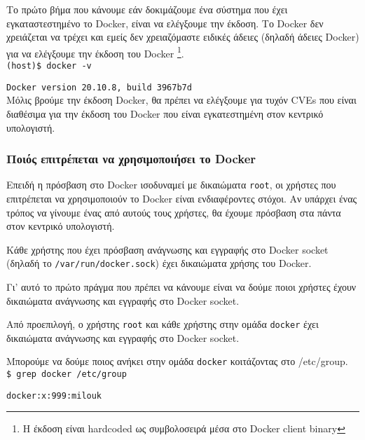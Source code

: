 Το πρώτο βήμα που κάνουμε εάν δοκιμάζουμε ένα σύστημα που έχει εγκαταστεστημένο
το \textlatin{Docker}, είναι να ελέγξουμε την έκδοση. Το \textlatin{Docker} δεν
χρειάζεται να τρέχει και εμείς δεν χρειαζόμαστε ειδικές άδειες (δηλαδή άδειες
\textlatin{Docker}) για να ελέγξουμε την έκδοση του \textlatin{Docker}
\footnote{Η έκδοση είναι \textlatin{hardcoded} ως συμβολοσειρά μέσα στο
\textlatin{Docker client binary}}. \\

\texttt{\textlatin{(host)\$ docker -v}}

\texttt{\textlatin{Docker version 20.10.8, build 3967b7d}} \\

Μόλις βρούμε την έκδοση \textlatin{Docker}, θα πρέπει να ελέγξουμε για τυχόν
\textlatin{CVEs} που είναι διαθέσιμα για την έκδοση του \textlatin{Docker} που
είναι εγκατεστημένη στον κεντρικό υπολογιστή.

\subsubsection{Ποιός επιτρέπεται να χρησιμοποιήσει το \textlatin{Docker}}

Επειδή η πρόσβαση στο \textlatin{Docker} ισοδυναμεί με δικαιώματα
\texttt{\textlatin{root}}, οι χρήστες που επιτρέπεται να χρησιμοποιούν το
\textlatin{Docker} είναι ενδιαφέροντες στόχοι. Αν υπάρχει ένας τρόπος να γίνουμε
ένας από αυτούς τους χρήστες, θα έχουμε πρόσβαση στα πάντα στον κεντρικό
υπολογιστή.

Κάθε χρήστης που έχει πρόσβαση ανάγνωσης και εγγραφής στο
\textlatin{Docker socket} (δηλαδή το \texttt{\textlatin{/var/run/docker.sock}})
έχει δικαιώματα χρήσης του \textlatin{Docker}.

Γι' αυτό το πρώτο πράγμα που πρέπει να κάνουμε είναι να δούμε ποιοι χρήστες
έχουν δικαιώματα ανάγνωσης και εγγραφής στο \textlatin{Docker socket}.

Από προεπιλογή, ο χρήστης \texttt{\textlatin{root}} και κάθε χρήστης στην ομάδα
\texttt{\textlatin{docker}} έχει δικαιώματα ανάγνωσης και εγγραφής στο
\textlatin{Docker socket}.

Μπορούμε να δούμε ποιος ανήκει στην ομάδα \texttt{\textlatin{docker}}
κοιτάζοντας στο \textlatin{/etc/group}. \\

\texttt{\textlatin{\$ grep docker /etc/group}}

\texttt{\textlatin{docker:x:999:milouk}} \\

